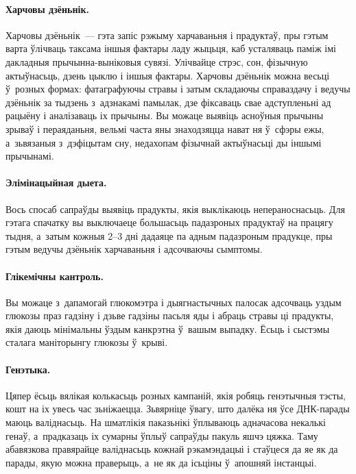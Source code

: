 \paragraph{Харчовы дзёньнік.}
Харчовы дзёньнік~--- гэта запіс рэжыму харчаваньня і прадуктаў, пры гэтым варта ўлічваць таксама іншыя фактары ладу жыцьця, каб усталяваць паміж імі дакладныя прычынна-выніковыя сувязі. Улічвайце стрэс, сон, фізычную актыўнасьць, дзень цыклю і іншыя фактары. Харчовы дзёньнік можна весьці ў~розных формах: фатаграфуючы стравы і затым складаючы справаздачу і ведучы дзёньнік за тыдзень з~адзнакамі памылак, дзе фіксаваць свае адступленьні ад рацыёну і аналізаваць іх прычыны. Вы можаце выявіць асноўныя прычыны зрываў і пераяданьня, вельмі часта яны знаходзяцца нават ня ў~сфэры ежы, а~зьвязаныя з~дэфіцытам сну, недахопам фізычнай актыўнасьці ды іншымі прычынамі.


\paragraph{Элімінацыйная дыета.}
Вось спосаб сапраўды выявіць прадукты, якія выклікаюць непераноснасьць. Для гэтага спачатку вы выключаеце большасьць падазроных прадуктаў на працягу тыдня, а~затым кожныя 2--3 дні дадаяце па адным падазроным прадукце, пры гэтым ведучы дзёньнік харчаваньня і адсочваючы сымптомы.

\paragraph{Глікемічны кантроль.}
Вы можаце з~дапамогай глюкомэтра і дыягнастычных палосак адсочваць уздым глюкозы праз гадзіну і дзьве гадзіны пасьля яды і абраць стравы ці прадукты, якія даюць мінімальны ўздым канкрэтна ў~вашым выпадку. Ёсьць і сыстэмы сталага маніторынгу глюкозы ў~крыві.

\paragraph{Генэтыка.}
Цяпер ёсьць вялікая колькасьць розных кампаній, якія робяць генэтычныя тэсты, кошт на іх увесь час зьніжаецца. Зьвярніце ўвагу, што далёка ня ўсе ДНК-парады маюць валіднасьць. На шматлікія паказьнікі ўплываюць адначасова некалькі генаў, а~прадказаць іх сумарны ўплыў сапраўды пакуль яшчэ цяжка. Таму абавязкова правярайце валіднасьць кожнай рэкамэндацыі і стаўцеся да яе як да парады, якую можна праверыць, а~не як да ісьціны ў~апошняй інстанцыі.

